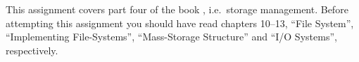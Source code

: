 This assignment covers part four of the book 
\cite{Silberschatz2013intl,Silberschatz2013osc}, i.e.\  storage management.
Before attempting this assignment you should have read chapters 10--13, ``File 
System'', ``Implementing File-Systems'', ``Mass-Storage Structure'' and ``I/O 
Systems'', respectively.
